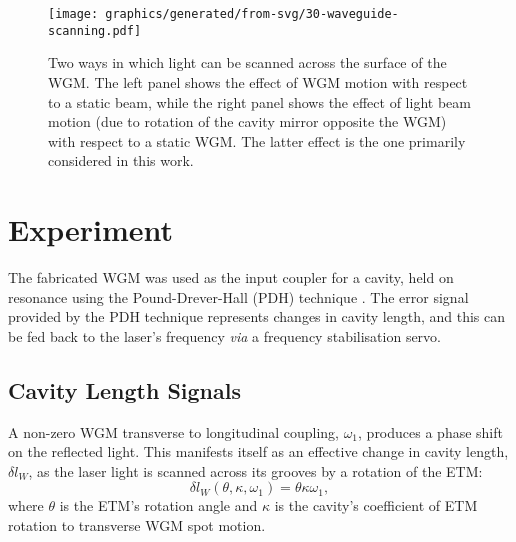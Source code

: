 \begin{figure}
  \centering
  \texttt{[image: graphics/generated/from-svg/30-waveguide-scanning.pdf]}
  \caption{\label{fig:waveguide-scanning}Two ways in which light can be scanned across the surface of the \gls{WGM}. The left panel shows the effect of \gls{WGM} motion with respect to a static beam, while the right panel shows the effect of light beam motion (due to rotation of the cavity mirror opposite the \gls{WGM}) with respect to a static \gls{WGM}. The latter effect is the one primarily considered in this work.}
\end{figure}

\section{Experiment}

The fabricated \gls{WGM} was used as the input coupler for a \FP{} cavity, held on resonance using the Pound-Drever-Hall (PDH) technique \cite{Drever1983}. The error signal provided by the PDH technique represents changes in cavity length, and this can be fed back to the laser's frequency \emph{via} a frequency stabilisation servo.

\subsection{Cavity Length Signals}
\label{sec:lengthsignals}

A non-zero \gls{WGM} transverse to longitudinal coupling, $\omega_1$, produces a phase shift on the reflected light. This manifests itself as an effective change in cavity length, $\delta l_W$, as the laser light is scanned across its grooves by a rotation of the \gls{ETM}:
\begin{equation}
  \delta l_W \left( \theta, \kappa, \omega_1 \right) = \theta \kappa \omega_1,
  \label{eq:wgm-length-change}
\end{equation}
where $\theta$ is the \gls{ETM}'s rotation angle and $\kappa$ is the cavity's coefficient of \gls{ETM} rotation to transverse \gls{WGM} spot motion.

